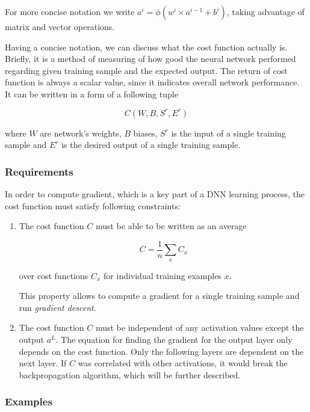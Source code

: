 For more concise notation we write $a^i = \phi(w^i \times a^{i-1} + b^i)$, taking advantage of matrix and vector operations.

Having a concise notation, we can discuss what the cost function actually is. Briefly, it is a method of measuring of how good the neural network performed regarding given training sample and the expected output. The return of cost function is always a scalar value, since it indicates overall network performance. It can be written in a form of a following tuple

\[C(W, B, S^r, E^r)\]

where $W$ are network's weights, $B$ biases, $S^r$ is the input of a single training sample and $E^r$ is the desired output of a single training sample.

\subsubsection*{Requirements}
\label{sub2:cost-requirements}

In order to compute gradient, which is a key part of a DNN learning process, the cost function must satisfy following constraints:

\begin{enumerate}
    \item The cost function $C$ must be able to be written as an average
    
        \[C = \frac{1}{n} \sum_x C_x\]
        
        over cost functions $C_x$ for individual training examples $x$.
    
        This property allows to compute a gradient for a single training sample and run \emph{gradient descent}.
    
    \item The cost function $C$ must be independent of any activation values except the output $a^L$.
    The equation for finding the gradient for the output layer only depends on the cost function. Only the following layers are dependent on the next layer. If $C$ was correlated with other activations, it would break the backpropagation algorithm, which will be further described.
\end{enumerate}

\subsubsection*{Examples}
\label{sub2:cost-function-examples}

